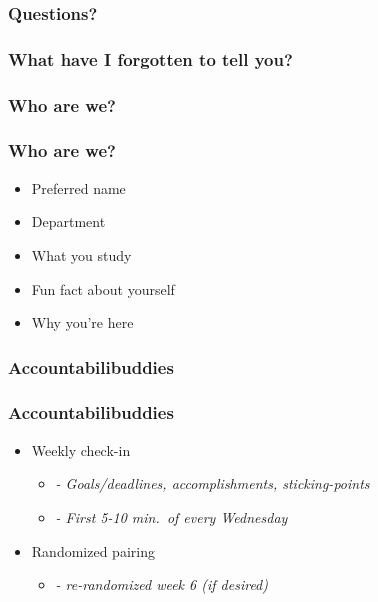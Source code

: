 \documentclass{beamer}
\begin{document}
\subsubsection{Questions?}

\begin{frame}
    \frametitle{What have I forgotten to tell you?}

\end{frame}


\subsubsection{Who are we?}

\begin{frame}
    \frametitle{Who are we?}

    \bigskip
    \begin{itemize}
        \item Preferred name
        \item Department
        \item What you study
        \item Fun fact about yourself
        \item Why you're here
    \end{itemize}


\end{frame}

\subsubsection{Accountabilibuddies}

\begin{frame}
  \frametitle{Accountabilibuddies}

  \begin{itemize}
    \item Weekly check-in
    \begin{itemize}
      \item[] \emph{- Goals/deadlines, accomplishments, sticking-points}
      \item[] \emph{- First 5-10 min.~of every Wednesday}
    \end{itemize}
    \item Randomized pairing
    \begin{itemize}
      \item[] \emph{- re-randomized week 6 (if desired)}
    \end{itemize}
  \end{itemize}

\end{frame}
\end{document}

